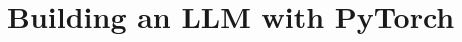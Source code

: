 \documentclass[../../main.tex]{subfiles}
\begin{document}
\section{Building an LLM with PyTorch}
\end{document}
